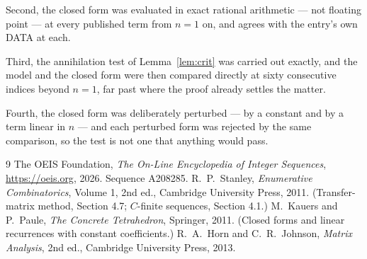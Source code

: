 \documentclass[11pt,a4paper]{article}
\theoremstyle{plain}
\theoremstyle{definition}
\begin{document}
Second, the closed form was evaluated in exact rational arithmetic --- not floating point ---
at every published term from $n=1$ on, and agrees with the entry's own DATA at each.

Third, the annihilation test of Lemma~\ref{lem:crit} was carried out exactly, and the model
and the closed form were then compared directly at sixty consecutive indices beyond
$n=1$, far past where the proof already settles the matter.

Fourth, the closed form was deliberately perturbed --- by a constant and by a term linear in
$n$ --- and each perturbed form was rejected by the same comparison, so the test is not one
that anything would pass.

\begin{thebibliography}{9}
 The OEIS Foundation, \emph{The On-Line Encyclopedia of Integer
Sequences}, \url{https://oeis.org}, 2026. Sequence A208285.
 R.~P.~Stanley, \emph{Enumerative Combinatorics}, Volume 1, 2nd ed.,
Cambridge University Press, 2011. (Transfer-matrix method, Section 4.7; $C$-finite sequences,
Section 4.1.)
 M.~Kauers and P.~Paule, \emph{The Concrete Tetrahedron}, Springer, 2011.
(Closed forms and linear recurrences with constant coefficients.)
 R.~A.~Horn and C.~R.~Johnson, \emph{Matrix Analysis}, 2nd ed., Cambridge
University Press, 2013.
\end{thebibliography}
\end{document}
